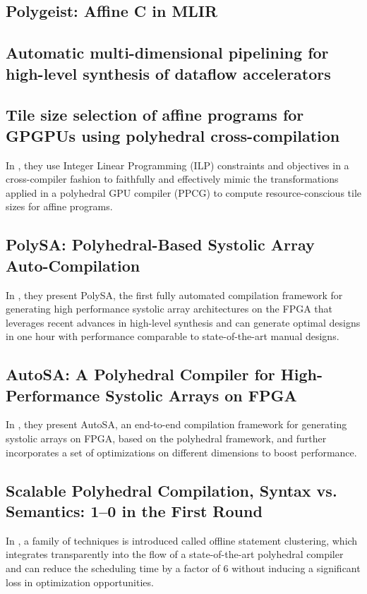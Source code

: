 \subsection{Polygeist: Affine C in MLIR}

\subsection{Automatic multi-dimensional pipelining for high-level synthesis of dataflow accelerators}

\subsection{Tile size selection of affine programs for GPGPUs using polyhedral cross-compilation}
In \cite{Abdelaal2021TileSS}, they use Integer Linear Programming (ILP) constraints and objectives in a cross-compiler fashion to faithfully and effectively mimic the transformations applied in a polyhedral GPU compiler (PPCG) to compute resource-conscious tile sizes for affine programs.

\subsection{PolySA: Polyhedral-Based Systolic Array Auto-Compilation}
In \cite{Cong2018PolySAPS}, they present PolySA, the first fully automated compilation framework for generating high performance systolic array architectures on the FPGA that leverages recent advances in high-level synthesis and can generate optimal designs in one hour with performance comparable to state-of-the-art manual designs.

\subsection{AutoSA: A Polyhedral Compiler for High-Performance Systolic Arrays on FPGA}
In \cite{Wang2021AutoSAAP}, they present AutoSA, an end-to-end compilation framework for generating systolic arrays on FPGA, based on the polyhedral framework, and further incorporates a set of optimizations on different dimensions to boost performance.

\subsection{Scalable Polyhedral Compilation, Syntax vs. Semantics: 1–0 in the First Round}
In \cite{48842}, a family of techniques is introduced called offline statement clustering, which integrates transparently into the flow of a state-of-the-art polyhedral compiler and can reduce the scheduling time by a factor of 6 without inducing a significant loss in optimization opportunities.

